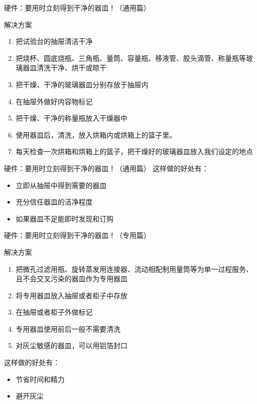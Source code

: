 \documentclass[CJKutf8]{beamer}
\newenvironment{SC}{%
  \CJKfamily{gbsn}%
  \CJKtilde
  \CJKnospace}{}
\begin{document}
\begin{CJK}{UTF8}{}
\begin{SC}
\begin{frame}{硬件：要用时立刻得到干净的器皿！（通用篇）}
  \begin{block}{解决方案}
    \begin{enumerate}
    \item 把试验台的抽屉清洁干净
    \item 把烧杯、圆底烧瓶、三角瓶、量筒、容量瓶、移液管、胶头滴管、称量瓶等玻璃器皿清洗干净、烘干或晾干
    \item 把干燥、干净的玻璃器皿分别存放于抽屉内
    \item 在抽屉外做好内容物标记
    \item 把干燥、干净的称量瓶放入干燥器中
    \item 使用器皿后，清洗，放入烘箱内或烘箱上的篮子里。
    \pause
    \item 每天检查一次烘箱和烘箱上的篮子，把干燥好的玻璃器皿放入我们设定的地点
    \end{enumerate}
  \end{block}
\end{frame}

\begin{frame}{硬件：要用时立刻得到干净的器皿！（通用篇）}
  这样做的好处有：
  \begin{itemize}
  \item 立即从抽屉中得到需要的器皿
  \pause
  \item 充分信任器皿的洁净程度
  \pause
  \item 如果器皿不足能即时发现和订购
  \end{itemize}
\end{frame}

\begin{frame}{硬件：要用时立刻得到干净的器皿！（专用篇）}
  \begin{block}{解决方案}
    \begin{enumerate}
    \item 把微孔过滤用瓶、旋转蒸发用连接器、流动相配制用量筒等为单一过程服务、且不会交叉污染的器皿作为专用器皿
    \item 将专用器皿放入抽屉或者柜子中存放
    \item 在抽屉或者柜子外做标记
    \item 专用器皿使用前后一般不需要清洗
    \item 对灰尘敏感的器皿，可以用铝箔封口
    \end{enumerate}
  \end{block}
  \pause
  这样做的好处有：
  \begin{itemize}
  \item 节省时间和精力
  \pause
  \item 避开灰尘
  \end{itemize}
\end{frame}


\end{SC}
\end{CJK}
\end{document}
